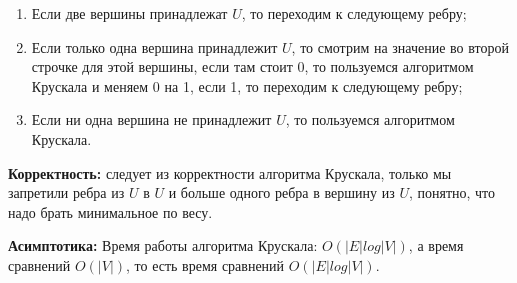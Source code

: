 \documentclass[a4paper,14pt]{article} %
\begin{document}
\begin{enumerate}
\item Если две вершины принадлежат $U$,  то переходим к следующему ребру;
\item Если только одна вершина принадлежит $U$,  то смотрим на значение во второй строчке для этой вершины,  если там стоит 0,  то пользуемся алгоритмом Крускала и меняем 0 на 1,  если 1,  то переходим к следующему ребру;
\item Если ни одна вершина не принадлежит $U$,  то пользуемся алгоритмом Крускала.
\end{enumerate}

\textbf{Корректность:} следует из корректности алгоритма Крускала,  только мы запретили ребра из $U$ в $U$ и больше одного ребра в вершину из $U$,  понятно,  что надо брать минимальное по весу.

\textbf{Асимптотика:} Время работы алгоритма Крускала: $O(|E|log|V|)$,  а время сравнений $O(|V|)$,  то есть время сравнений $O(|E|log|V|)$.
\end{document}
